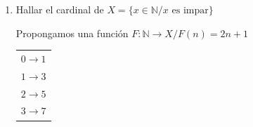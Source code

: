 \begin{enumerate}
\begin{proof}
\begin{itemize}
    \item $x \geq 0, y < 0$: $x \neq y$
        \begin{gather*}
            F(x) = 2x \text{ es par y } F(y) = -2y-1 \text{ es impar.} \\
            \therefore ~ F(x) \neq F(y) 
        \end{gather*}

    \item $y \geq 0, x < 0$: $y \neq x$
        \begin{gather*}
            F(x) = -2x-1 \text{ es impar y } F(y) = 2y \text{ es par.} \\
            \therefore ~ F(x) \neq F(y) 
        \end{gather*}
\end{itemize}

De este modo, probamos la inyectividad.

Nos queda probar la sobreyectividad. Para ello, volvemos a separar en casos.

\begin{enumerate}[%
                labelindent=*,
                style=multiline,
                leftmargin=*,
                align=left,
                leftmargin=2\parindent,
                label=Caso \arabic*)]
    \item Sea $b \in \mathbb{N}$ tal que $b$ es par.
        \[  F \underbrace{%
                \left(\nicefrac{b}{2}\right)}_{\in \mathbb{Z}_{\geq 0}}
             = 2 \; . \; \frac{b}{2} = b \]

    \item Sea $b \in \mathbb{N}$ tal que $b$ es impar.
        \[  F \underbrace{\Bigg( \frac%
            {\overbrace{b+1}^{\text{Par}}}{-2} %
            \Bigg)}_{\in \mathbb{Z}_{< 0}} 
            = (-2) \; . \; \left( \frac{b+1}{-2} \right) -1 = b+1-1 = b \]
\end{enumerate}

Así probamos la sobreyectividad.

Por lo tanto, $F$ es biyectiva y, en consecuencia, 
$\# \mathbb{Z} = \#\mathbb{N}$ %

\end{proof}

\medskip
\item Hallar el cardinal de $X = \{x \in \mathbb{N} / x \text{ es impar}\}$

    Propongamos una función $F: \mathbb{N} \to X/ F(n) = 2n+1$
    \begin{center}
        \begin{tabular}{c}
            $0 \to 1$ \\ $1 \to 3$ \\ $2 \to 5$ \\ $3 \to 7$
        \end{tabular}
    \end{center}


\end{enumerate}
